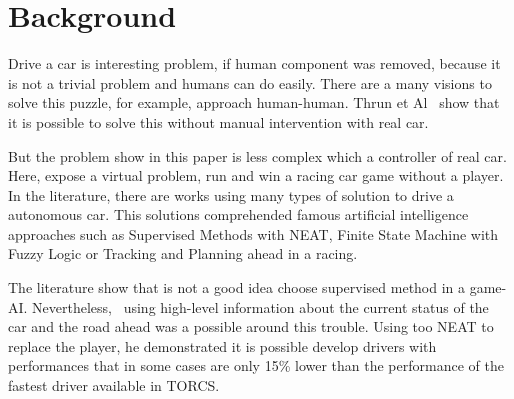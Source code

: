 \section{Background}

Drive a car is interesting problem, if human component was removed, because it is not a trivial problem and humans can do easily. There are a many visions to solve this puzzle, for example, approach human-human. Thrun et Al~\cite{Thrun06}  show that it is possible to solve this without manual intervention with real car.

But the problem show in this paper is less complex which a controller of real car. Here, expose a virtual problem, run and win a racing car game without a player. In the literature, there are works using many types of solution to drive a autonomous car. This solutions comprehended famous artificial intelligence approaches such as Supervised Methods with NEAT, Finite State Machine with Fuzzy Logic or Tracking and Planning ahead in a racing.

The literature show that is not a good idea choose supervised method in a game-AI. Nevertheless,~\cite{learn} using high-level information about the current status of the car and the road ahead was a possible around this trouble. Using too NEAT to replace the player, he demonstrated it is possible develop drivers with performances that in some cases are only 15\% lower than the performance of the fastest driver available in TORCS.